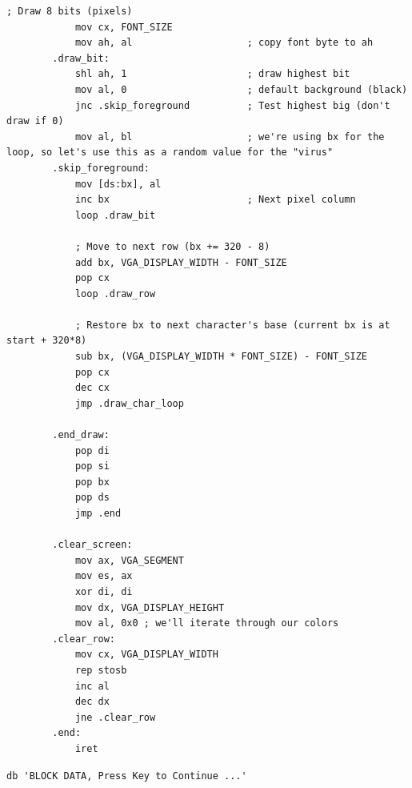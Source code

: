 \documentclass{article}
\begin{document}
\begin{lstlisting}[caption={virusV06.asm listing}, captionpos=t]
            ; Draw 8 bits (pixels)
            mov cx, FONT_SIZE
            mov ah, al                    ; copy font byte to ah
        .draw_bit:
            shl ah, 1                     ; draw highest bit
            mov al, 0                     ; default background (black)
            jnc .skip_foreground          ; Test highest big (don't draw if 0)
            mov al, bl                    ; we're using bx for the loop, so let's use this as a random value for the "virus"
        .skip_foreground:
            mov [ds:bx], al
            inc bx                        ; Next pixel column
            loop .draw_bit

            ; Move to next row (bx += 320 - 8)
            add bx, VGA_DISPLAY_WIDTH - FONT_SIZE
            pop cx
            loop .draw_row

            ; Restore bx to next character's base (current bx is at start + 320*8)
            sub bx, (VGA_DISPLAY_WIDTH * FONT_SIZE) - FONT_SIZE
            pop cx
            dec cx
            jmp .draw_char_loop

        .end_draw:
            pop di
            pop si
            pop bx
            pop ds
            jmp .end

        .clear_screen:
            mov ax, VGA_SEGMENT
            mov es, ax
            xor di, di
            mov dx, VGA_DISPLAY_HEIGHT
            mov al, 0x0 ; we'll iterate through our colors
        .clear_row:
            mov cx, VGA_DISPLAY_WIDTH
            rep stosb
            inc al
            dec dx
            jne .clear_row
        .end:
            iret
    \end{lstlisting}
    \begin{lstlisting}[caption={stringV06.asm listing}, captionpos=t]
        db 'BLOCK DATA, Press Key to Continue ...'
    \end{lstlisting}
    
\end{document}

